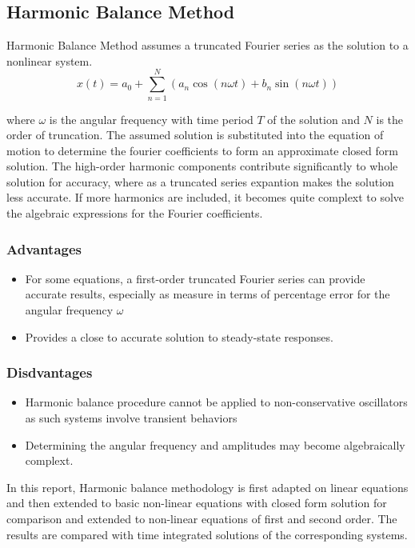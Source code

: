 \documentclass[12pt, a4paper]{extarticle}
\begin{document}
\subsection{Harmonic Balance Method}
{Harmonic Balance Method assumes a truncated Fourier series as the solution to a nonlinear system. 
\begin{equation}
x(t) = a_0+\sum\limits_{n=1}^N (a_n \cos(n\omega t)+b_n \sin(n \omega t))
\end{equation}

where $\omega$ is the angular frequency with time period $T$ of the solution and $N$ is the order of truncation. 
The assumed solution is substituted into the equation of motion to determine the fourier coefficients to form an approximate closed form solution. The high-order harmonic components contribute significantly to whole solution for accuracy, where as a truncated series expantion makes the solution less accurate. If more harmonics are included, it becomes quite complext to solve the algebraic expressions for the Fourier coefficients.

\subsubsection{Advantages}
\begin{itemize}
\item{For some equations, a first-order truncated Fourier series can provide accurate results, especially as measure in terms of percentage error for the angular frequency $\omega$}
\item{Provides a close to accurate solution to steady-state responses.}
\end{itemize}

\subsubsection{Disdvantages}
\begin{itemize}
\item{Harmonic balance procedure cannot be applied to non-conservative oscillators as such systems involve transient behaviors}
\item{Determining the angular frequency and amplitudes may become algebraically complext.}
\end{itemize}

In this report, Harmonic balance methodology is first adapted on  linear equations and then extended to basic non-linear equations with closed form solution for comparison and extended to non-linear equations of first and second order. The results are compared with time integrated solutions of the corresponding systems.}
\end{document}
